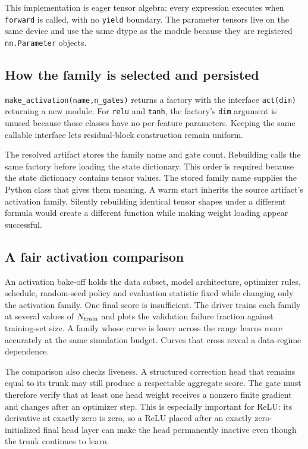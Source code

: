 \documentclass[10pt,aps,prd,twocolumn,nofootinbib]{revtex4-2}
\newcommand{\code}[1]{\texttt{#1}}
\begin{document}
This implementation is eager tensor algebra: every expression executes when
\code{forward} is called, with no \code{yield} boundary.  The parameter tensors live on the same device and use the same
dtype as the module because they are registered \code{nn.Parameter} objects.

\subsection{How the family is selected and persisted}

\code{make\_activation(name,n\_gates)} returns a factory with the interface
\code{act(dim)} returning a new module.  For \code{relu} and \code{tanh}, the
factory's \code{dim} argument is unused because those classes have no
per-feature parameters.  Keeping the same callable interface lets
residual-block construction remain uniform.

The resolved artifact stores the family name and gate count.  Rebuilding
calls the same factory before loading the state dictionary.  This order is
required because the state dictionary contains tensor values.  The stored
family name supplies the Python class that gives them meaning.  A warm start inherits the source
artifact's activation family.  Silently rebuilding identical tensor shapes
under a different formula would create a different function while making
weight loading appear successful.

\subsection{A fair activation comparison}

An activation bake-off holds the data subset, model architecture, optimizer
rules, schedule, random-seed policy and evaluation statistic fixed while
changing only the activation family.  One final score is insufficient.  The
driver trains each family at several values of \(N_{\rm train}\) and plots
the validation failure fraction against training-set size.  A family whose
curve is lower across the range learns more accurately at the same simulation
budget.  Curves that cross reveal a data-regime dependence.

The comparison also checks liveness.  A structured correction head that
remains equal to its trunk may still produce a respectable aggregate score.
The gate must therefore verify that at least one head weight receives a
nonzero finite gradient and changes after an optimizer step.  This is
especially important for ReLU: its derivative at exactly zero is zero, so a
ReLU placed after an exactly zero-initialized final head layer can make the
head permanently inactive even though the trunk continues to learn.
\end{document}
